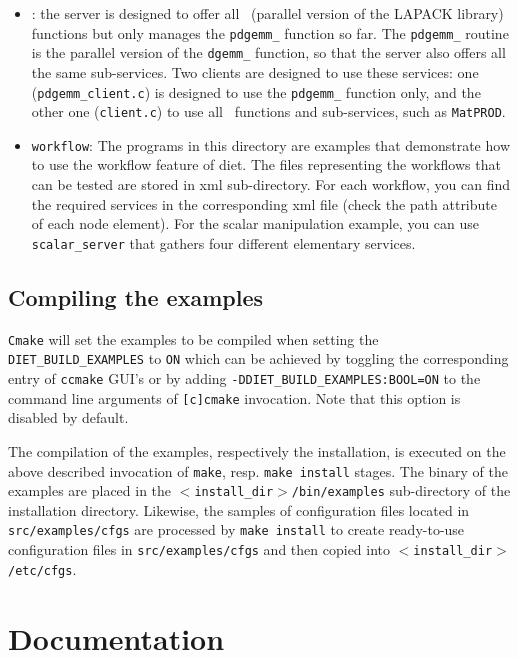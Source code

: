 \begin{itemize}
\item{\texttt{\scalapack}}: the server is designed to offer all
  \scalapack\  (parallel version of the LAPACK library) functions but
  only manages the \texttt{pdgemm\_} function so far. The
  \texttt{pdgemm\_} routine is the parallel version of the
  \texttt{dgemm\_} function, so that the server also offers all the
  same sub-services. Two clients are designed to use these services:
  one (\texttt{pdgemm\_client.c}) is designed to use the
  \texttt{pdgemm\_} function only, and the other one
  (\texttt{client.c}) to use all \scalapack\ functions and
  sub-services, such as \texttt{MatPROD}.

\item{\texttt{workflow}}: The programs in this directory are examples that
  demonstrate how to use the workflow feature of diet.
  The files representing the workflows that can be tested are stored in
  xml sub-directory.
  For each workflow, you can find the required services in the corresponding
  xml file (check the path attribute of each node element).
  For the scalar manipulation example, you can use \texttt{scalar\_server}
  that gathers four different elementary services.
\end{itemize}

\subsection{Compiling the examples}
\label{subsection:compiling-examples}

\verb+Cmake+ will set the examples to be compiled when setting the 
\verb+DIET_BUILD_EXAMPLES+ to \verb+ON+ which can be achieved by
toggling the corresponding entry of \verb+ccmake+ GUI's or by adding
\verb+-DDIET_BUILD_EXAMPLES:BOOL=ON+ to the command line
arguments of \verb+[c]cmake+ invocation.
Note that this option is disabled by default.

The compilation of the examples, respectively the installation, is
executed on the above described invocation of \verb+make+, resp. 
\verb+make install+ stages.
The binary of the examples are placed in the 
\texttt{$<$install\_dir$>$/bin/examples} sub-directory of the installation
directory.
Likewise, the samples of configuration files located in
\texttt{src/examples/cfgs} are processed by \texttt{make install} to
create ready-to-use configuration files in \texttt{src/examples/cfgs} and
then copied into \texttt{$<$install\_dir$>$/etc/cfgs}.

\section{Documentation}
\label{section:compiling-documentation}


